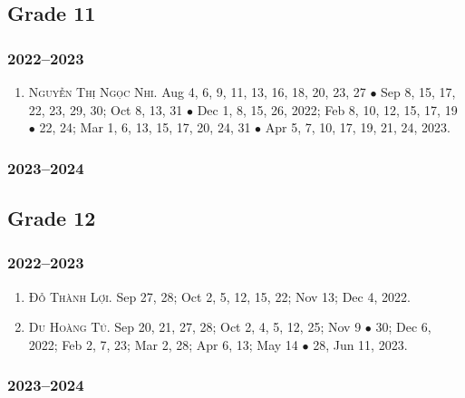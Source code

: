 \documentclass{article}
\begin{document}

\subsection{Grade 11}

\subsubsection{2022--2023}

\begin{enumerate}
	\item \textsc{Nguyễn Thị Ngọc Nhi.} {\sf[In]} Aug 4, 6, 9, 11, 13, 16, 18, 20, 23, 27 $\bullet$ Sep 8, 15, 17, 22, 23, 29, 30; Oct 8, 13, 31 $\bullet$ Dec 1, 8,  15, 26, 2022; Feb 8, 10, 12, 15, 17, 19 $\bullet$ 22, 24; Mar 1, 6, 13, 15, 17, 20, 24, 31 $\bullet$ Apr 5, 7, 10, 17, 19, 21, 24, 2023.
\end{enumerate}

\subsubsection{2023--2024}


\subsection{Grade 12}

\subsubsection{2022--2023}

\begin{enumerate}
	\item \textsc{Đỗ Thành Lợi.} {\sf[In]} Sep 27, 28; Oct 2, 5, 12, 15, 22; Nov 13; Dec 4, 2022. {\sf[Out]}
	\item \textsc{Du Hoàng Tú.} {\sf[In]} Sep 20, 21, 27, 28; Oct 2, 4, 5, 12, 25; Nov 9 $\bullet$ 30; Dec 6, 2022; Feb 2, 7, 23; Mar 2, 28; Apr 6, 13; May 14 $\bullet$ 28, Jun 11, 2023. {\sf[Out]}
\end{enumerate}

\subsubsection{2023--2024}
\end{document}
